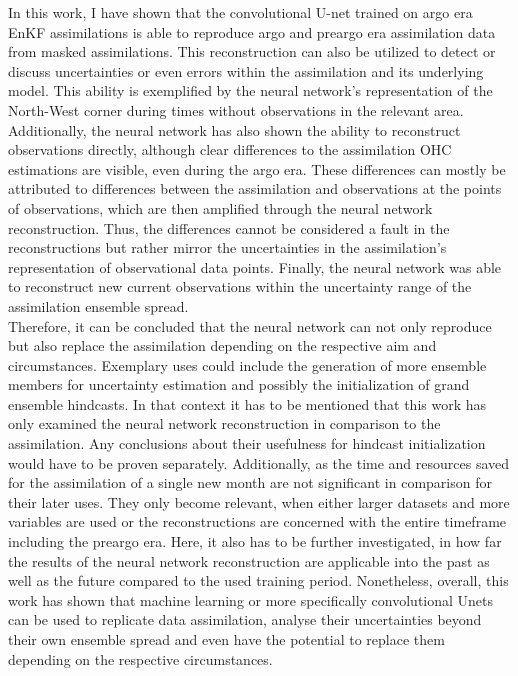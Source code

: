 \documentclass[11pt,a4paper]{scrreprt}	%
\begin{document}
 	In this work, I have shown that the convolutional U-net trained on argo era EnKF assimilations is able to reproduce argo and preargo era assimilation data from masked assimilations. This reconstruction can also be utilized to detect or discuss uncertainties or even errors within the assimilation and its underlying model. This ability is exemplified by the neural network's representation of the North-West corner during times without observations in the relevant area. Additionally, the neural network has also shown the ability to reconstruct observations directly, although clear differences to the assimilation OHC estimations are visible, even during the argo era. These differences can mostly be attributed to differences between the assimilation and observations at the points of observations, which are then amplified through the neural network reconstruction. Thus, the differences cannot be considered a fault in the reconstructions but rather mirror the uncertainties in the assimilation's representation of observational data points. Finally, the neural network was able to reconstruct new current observations within the uncertainty range of the assimilation ensemble spread.\\
 	Therefore, it can be concluded that the neural network can not only reproduce but also replace the assimilation depending on the respective aim and circumstances. Exemplary uses could include the generation of more ensemble members for uncertainty estimation and possibly the initialization of grand ensemble hindcasts. In that context it has to be mentioned that this work has only examined the neural network reconstruction in comparison to the assimilation. Any conclusions about their usefulness for hindcast initialization would have to be proven separately. Additionally, as the time and resources saved for the assimilation of a single new month are not significant in comparison for their later uses. They only become relevant, when either larger datasets and more variables are used or the reconstructions are concerned with the entire timeframe including the preargo era. Here, it also has to be further investigated, in how far the results of the neural network reconstruction are applicable into the past as well as the future compared to the used training period. Nonetheless, overall, this work has shown that machine learning or more specifically convolutional Unets can be used to replicate data assimilation, analyse their uncertainties beyond their own ensemble spread and even have the potential to replace them depending on the respective circumstances. \\
 	
 	
	
	
	
	
	
	
	
\end{document}
